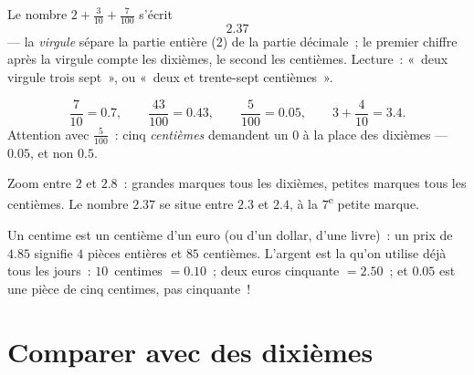 \begin{definition}\label{def:g4:decimals:point}
Le nombre $2 + \frac{3}{10} + \frac{7}{100}$ s'écrit
\[
2.37
\]
--- la \emph{virgule} sépare la partie entière ($2$) de la partie
décimale~; le premier chiffre après la virgule compte les dixièmes,
le second les centièmes. Lecture~: «~deux virgule trois sept~», ou
«~deux et trente-sept centièmes~».
\end{definition}

\begin{example}\label{ex:g4:decimals:convert}
\[
\frac{7}{10} = 0.7, \qquad
\frac{43}{100} = 0.43, \qquad
\frac{5}{100} = 0.05, \qquad
3 + \frac{4}{10} = 3.4 .
\]
Attention avec $\frac{5}{100}$~: cinq \emph{centièmes} demandent un
$0$ à la place des dixièmes --- $0.05$, et non $0.5$.
\end{example}

\begin{omfigure}

{\small Zoom entre $2$ et $2.8$~: grandes marques tous les dixièmes,
petites marques tous les centièmes. Le nombre $2.37$ se situe entre
$2.3$ et $2.4$, à la $7$\textsuperscript{e} petite marque.}
\end{omfigure}

\begin{example}\label{ex:g4:decimals:money}
Un centime est un centième d'un euro (ou d'un dollar, d'une
livre)~: un prix de $4.85$ signifie $4$ pièces entières et
$85$ centièmes. L'argent est la  qu'on utilise déjà tous les
jours~: $10$~centimes $= 0.10$~; deux euros cinquante $= 2.50$~; et
$0.05$ est une pièce de cinq centimes, pas cinquante~!
\end{example}

\section{Comparer avec des dixièmes}

